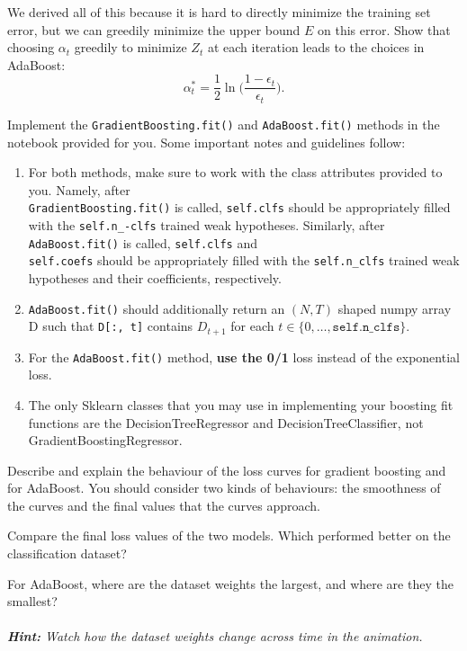 \problem[2] We derived all of this because it is hard to directly minimize the training set error,
but we can greedily minimize the upper bound $E$ on this error. Show that choosing $\alpha_t$ greedily to minimize $Z_t$ at each iteration leads to the choices in AdaBoost:
\[ \alpha_t^* = \dfrac{1}{2} \ln\Big(\dfrac{1-\epsilon_t}{\epsilon_t}\Big). \]
\begin{solution}
\end{solution}
\newpage



\problem[14] Implement the \texttt{GradientBoosting.fit()} and \texttt{AdaBoost.fit()} methods in
the notebook provided for you. Some important notes and guidelines follow:
\begin{enumerate}[$\bullet$]
\item For both methods, make sure to work with the class attributes provided to you. Namely, after\\
\texttt{GradientBoosting.fit()} is called, \texttt{self.clfs} should be appropriately filled with the \texttt{self.n_-clfs} trained weak hypotheses. Similarly, after \texttt{AdaBoost.fit()} is called, \texttt{self.clfs} and\\
\texttt{self.coefs}
should be appropriately filled with the \texttt{self.n_clfs} trained weak hypotheses and their coefficients, respectively.
\item \texttt{AdaBoost.fit()} should additionally return an $(N, T)$ shaped numpy array D such that \texttt{D[:, t]} contains $D_{t+1}$ for each $t \in \{0, \dots, \texttt{self.n_clfs}\}$.
\item For the \texttt{AdaBoost.fit()} method, \textbf{use the 0/1} loss instead of the exponential loss.
\item The only Sklearn classes that you may use in implementing your boosting fit functions are the DecisionTreeRegressor and DecisionTreeClassifier, not GradientBoostingRegressor.
\end{enumerate}
\begin{solution}
\end{solution}
\newpage


\problem[2] Describe and explain the behaviour of the loss curves for gradient boosting and for
AdaBoost. You should consider two kinds of behaviours: the smoothness of the curves and the final values that the curves approach.
\begin{solution}
\end{solution}
\newpage


\problem[2] Compare the final loss values of the two models. Which performed better on the
classification dataset?
\begin{solution}
\end{solution}
\newpage


\problem[2] For AdaBoost, where are the dataset weights the largest, and where are they the
smallest?\\
\\
\textit{\textbf{Hint:} Watch how the dataset weights change across time in the animation.}
\begin{solution}
\end{solution}
\newpage




